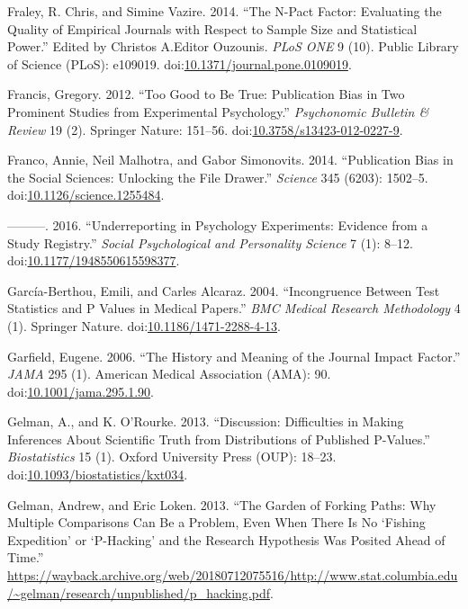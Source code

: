 \documentclass[a5paper]{book}
\begin{document}
\hypertarget{ref-doi:10.1371ux2fjournal.pone.0109019}{}
Fraley, R. Chris, and Simine Vazire. 2014. ``The N-Pact Factor:
Evaluating the Quality of Empirical Journals with Respect to Sample Size
and Statistical Power.'' Edited by Christos A.Editor Ouzounis.
\emph{PLoS ONE} 9 (10). Public Library of Science (PLoS): e109019.
doi:\href{https://doi.org/10.1371/journal.pone.0109019}{10.1371/journal.pone.0109019}.

\hypertarget{ref-doi:10.3758ux2fs13423-012-0227-9}{}
Francis, Gregory. 2012. ``Too Good to Be True: Publication Bias in Two
Prominent Studies from Experimental Psychology.'' \emph{Psychonomic
Bulletin \& Review} 19 (2). Springer Nature: 151--56.
doi:\href{https://doi.org/10.3758/s13423-012-0227-9}{10.3758/s13423-012-0227-9}.

\hypertarget{ref-doi:10.1126ux2fscience.1255484}{}
Franco, Annie, Neil Malhotra, and Gabor Simonovits. 2014. ``Publication
Bias in the Social Sciences: Unlocking the File Drawer.'' \emph{Science}
345 (6203): 1502--5.
doi:\href{https://doi.org/10.1126/science.1255484}{10.1126/science.1255484}.

\hypertarget{ref-doi:10.1177ux2f1948550615598377}{}
---------. 2016. ``Underreporting in Psychology Experiments: Evidence
from a Study Registry.'' \emph{Social Psychological and Personality
Science} 7 (1): 8--12.
doi:\href{https://doi.org/10.1177/1948550615598377}{10.1177/1948550615598377}.

\hypertarget{ref-doi:10.1186ux2f1471-2288-4-13}{}
García-Berthou, Emili, and Carles Alcaraz. 2004. ``Incongruence Between
Test Statistics and P Values in Medical Papers.'' \emph{BMC Medical
Research Methodology} 4 (1). Springer Nature.
doi:\href{https://doi.org/10.1186/1471-2288-4-13}{10.1186/1471-2288-4-13}.

\hypertarget{ref-doi:10.1001ux2fjama.295.1.90}{}
Garfield, Eugene. 2006. ``The History and Meaning of the Journal Impact
Factor.'' \emph{JAMA} 295 (1). American Medical Association (AMA): 90.
doi:\href{https://doi.org/10.1001/jama.295.1.90}{10.1001/jama.295.1.90}.

\hypertarget{ref-doi:10.1093ux2fbiostatisticsux2fkxt034}{}
Gelman, A., and K. O'Rourke. 2013. ``Discussion: Difficulties in Making
Inferences About Scientific Truth from Distributions of Published
P-Values.'' \emph{Biostatistics} 15 (1). Oxford University Press (OUP):
18--23.
doi:\href{https://doi.org/10.1093/biostatistics/kxt034}{10.1093/biostatistics/kxt034}.

\hypertarget{ref-gelman-forking}{}
Gelman, Andrew, and Eric Loken. 2013. ``The Garden of Forking Paths: Why
Multiple Comparisons Can Be a Problem, Even When There Is No `Fishing
Expedition' or `P-Hacking' and the Research Hypothesis Was Posited Ahead
of Time.''
\url{https://wayback.archive.org/web/20180712075516/http://www.stat.columbia.edu/~gelman/research/unpublished/p_hacking.pdf}.
\end{document}
